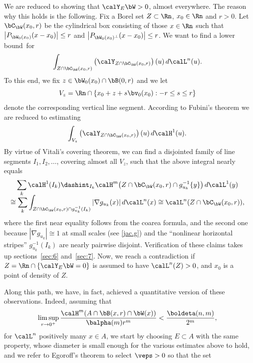 We are reduced to showing that $\calY_E \bW > 0$, almost everywhere.
The reason why this holds is the following.
Fix a Borel set $Z \subset \Rn$, $x_0 \in \Rn$ and $r > 0$.
Let $\bC_\bW(x_0,r)$ be the cylindrical box consisting of those $x \in \Rn$ such that $\left|P_{\bW_0(x_0)}(x-x_0) \right| \leq r$ and $\left|P_{\bW_0(x_0)^\perp}(x-x_0) \right| \leq r$.
We want to find a lower bound~for
\begin{equation*}
\int_{Z \cap \bC_\bW(x_0,r)} \left(\calY_{Z \cap \bC_\bW(x_0,r)}\right)(u) \,d\calL^n(u).
\end{equation*}
To this end, we fix $z \in \bW_0(x_0) \cap \bB(0,r)$ and we let
\[
V_z = \Rn \cap \{ x_0 + z + s\bv_0(x_0): -r \leq s \leq r \}
\]
denote the corresponding vertical line segment.
According to Fubini's theorem we are reduced to estimating
\begin{equation*}
\int_{V_z} \left(\calY_{Z \cap \bC_\bW(x_0,r)}\right)(u) \,d\calH^1(u).
\end{equation*}
By virtue of Vitali's covering theorem, we can find a disjointed family of line segments $I_1,I_2,\ldots$, covering almost all $V_z$, such that the above integral nearly equals
\begin{multline*}
\sum_k \calH^1(I_k) \dashint_{I_k} \calH^m \bigl(Z \cap \bC_\bW(x_0,r) \cap g_{u_k}^{-1} \{y\}\bigr) \,d\calL^1(y) \\[-5pt]
\cong \sum_k \int_{ Z \cap \bC_\bW(x_0,r) \cap g_{u_k}^{-1} (I_k)} | \nabla g_{u_k}(x)| \,d\calL^n(x) \cong \calL^n(Z \cap \bC_\bW(x_0,r)),
\end{multline*}
where the first near equality follows from the coarea formula, and the second one because $\left| \nabla g_{u_k} \right| \cong 1$ at small scales (see \ref{jac.g}) and the ``nonlinear horizontal stripes'' $g_{u_k}^{-1} (I_k)$ are nearly pairwise disjoint.
Verification of these claims takes up sections~\ref{sec:6} and~\ref{sec:7}.
Now, we reach a contradiction if $Z = \Rn \cap \{ \calY_E \bW = 0\}$ is assumed to have $\calL^n(Z) > 0$, and $x_0$ is a point of density of $Z$.
\par
Along this path, we have, in fact, achieved a quantitative version of these observations.
Indeed, assuming that
\[
\limsup_{r \to 0^+} \frac{\calH^m (A \cap \bB(x,r) \cap \bW(x))}{\balpha(m)r^m} < \frac{\boldeta(n,m)}{2^m},
\]
for $\calL^n$ positively many $x \in A$, we start by choosing $E \subset A$ with the same property, whose diameter is small enough for the various estimates above to hold, and we refer to Egoroff's theorem to select $\veps > 0$ so that the set

